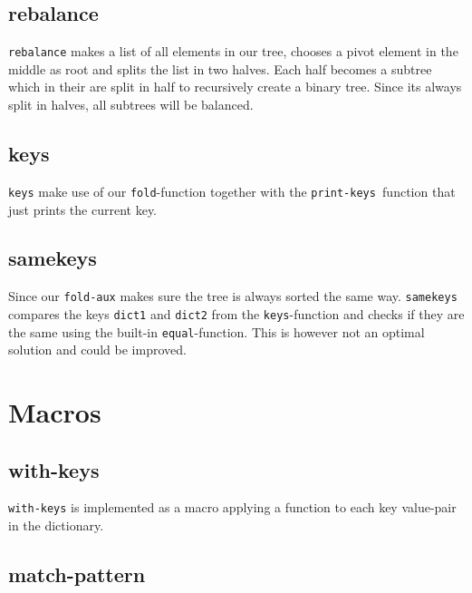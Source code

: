 \documentclass[a4paper,11pt]{article}
\begin{document}
\subsection{rebalance}
\texttt{rebalance} makes a list of all elements in our tree, chooses a pivot element in the middle as root and splits the list in two halves. Each half becomes a subtree which in their are split in half to recursively create a binary tree. Since its always split in halves, all subtrees will be balanced.

\subsection{keys}
\texttt{keys} make use of our \texttt{fold}-function together with the \texttt{print-keys }function  that just prints the current key.

\subsection{samekeys}
Since our \texttt{fold-aux} makes sure the tree is always sorted the same way. \texttt{samekeys} compares the keys \texttt{dict1} and \texttt{dict2} from the \texttt{keys}-function and checks if they are the same using the built-in \texttt{equal}-function. This is however not an optimal solution and could be improved.

\section{Macros}

\subsection{with-keys}
\texttt{with-keys} is implemented as a macro applying a function to each key value-pair in the dictionary.

\subsection{match-pattern}
\end{document}

